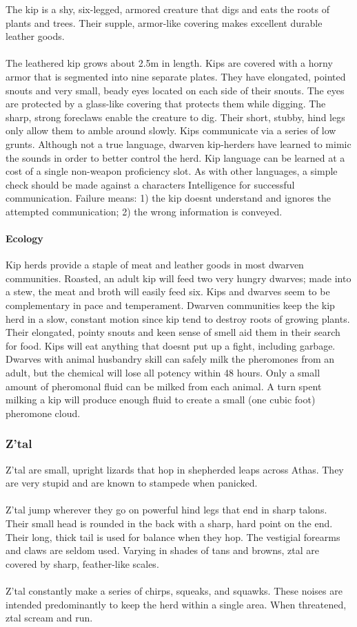 The kip is a shy, six-legged, armored creature that digs and eats
the roots of plants and trees. Their supple, armor-like covering
makes excellent durable leather goods.\\
\\
The leathered kip grows about 2.5m in length. Kips are covered
with a horny armor that is segmented into nine separate plates.
They have elongated, pointed snouts and very small, beady
eyes located on each side of their snouts. The eyes are protected
by a glass-like covering that protects them while digging. The
sharp, strong foreclaws enable the creature to dig. Their short,
stubby, hind legs only allow them to amble around slowly.
Kips communicate via a series of low grunts. Although not a
true language, dwarven kip-herders have learned to mimic the
sounds in order to better control the herd. Kip language can be
learned at a cost of a single non-weapon proficiency slot. As
with other languages, a simple check should be made against a
characters Intelligence for successful communication. Failure
means: 1) the kip doesnt understand and ignores the attempted
communication; 2) the wrong information is conveyed.

\paragraph{Ecology}
Kip herds provide a staple of meat and leather goods in
most dwarven communities. Roasted, an adult kip will feed two
very hungry dwarves; made into a stew, the meat and broth will
easily feed six. Kips and dwarves seem to be complementary in
pace and temperament. Dwarven communities keep the kip
herd in a slow, constant motion since kip tend to destroy roots
of growing plants. Their elongated, pointy snouts and keen
sense of smell aid them in their search for food. Kips will eat
anything that doesnt put up a fight, including garbage.
Dwarves with animal husbandry skill can safely milk the
pheromones from an adult, but the chemical will lose all potency
within 48 hours. Only a small amount of pheromonal fluid
can be milked from each animal. A turn spent milking a kip will
produce enough fluid to create a small (one cubic foot) pheromone
cloud.

\subsubsection{Z'tal}
Z'tal are small, upright lizards that hop in shepherded leaps
across Athas. They are very stupid and are known to stampede
when panicked.\\
\\
Z'tal jump wherever they go on powerful hind legs that end in
sharp talons. Their small head is rounded in the back with a
sharp, hard point on the end. Their long, thick tail is used for
balance when they hop. The vestigial forearms and claws are
seldom used. Varying in shades of tans and browns, ztal are
covered by sharp, feather-like scales.\\
\\
Z'tal constantly make a series of chirps, squeaks, and
squawks. These noises are intended predominantly to keep the
herd within a single area. When threatened, ztal scream and
run.

